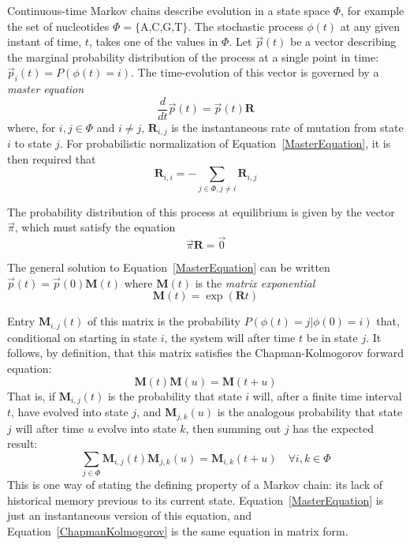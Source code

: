 \documentclass{bmcart}
\newcommand{\matr}[1]{\mathbf{#1}}
\newcommand{\eqref}[1]{Equation~\ref{#1}}
\newcommand{\statespace}{\Phi}
\newcommand{\state}{\phi}
\newcommand{\statevec}{\vec{p}}
\newcommand{\ratematrix}{\matr{R}}
\newcommand{\eqmvec}{\vec{\pi}}
\newcommand{\condmatrix}{\matr{M}}
\begin{document}
Continuous-time Markov chains describe evolution in a state space $\statespace$,
for example the set of nucleotides $\statespace = \{ \mbox{A,C,G,T} \}$.
The stochastic process $\state(t)$ at any given instant of time, $t$,
takes one of the values in $\statespace$.
Let $\statevec(t)$ be a vector describing the marginal probability distribution of the process
at a single point in time:
$\statevec_i(t) = P(\state(t) = i)$.
The time-evolution of this vector is governed by a {\em master equation}
\begin{equation}
\frac{d}{dt} \statevec(t) = \statevec(t) \ratematrix
\label{MasterEquation}
\end{equation}
where, for $i,j \in \statespace$ and $i \neq j$,
$\ratematrix_{i,j}$ is the instantaneous rate of mutation from state $i$ to state $j$.
For probabilistic normalization of \eqref{MasterEquation},
it is then required that
\[
\ratematrix_{i,i} = -\sum_{j \in \statespace, j \neq i} \ratematrix_{i,j}
\]

The probability distribution of this process at equilibrium is given by the vector $\eqmvec$,
which must satisfy the equation
\[
\eqmvec \ratematrix = \vec{0}
\]

The general solution to \eqref{MasterEquation} can be
written $\statevec(t) = \statevec(0) \condmatrix(t)$
where $\condmatrix(t)$ is the {\em matrix exponential}
\begin{equation}
\condmatrix(t) = \exp ( \ratematrix t )
\label{MatrixExponential}
\end{equation}

Entry $\condmatrix_{i,j}(t)$ of this matrix is the probability
$P(\state(t)=j|\state(0)=i)$
that, conditional on starting in state $i$,
the system will after time $t$ be in state $j$.
It follows, by definition, that this matrix satisfies the
Chapman-Kolmogorov forward equation:
\begin{equation}
\condmatrix(t) \condmatrix(u) = \condmatrix(t+u)
\label{ChapmanKolmogorov}
\end{equation}
That is, if $\condmatrix_{i,j}(t)$ is the probability
that state $i$ will, after a finite time interval $t$, have evolved into state $j$,
and $\condmatrix_{j,k}(u)$ is the analogous probability that state $j$ will after time $u$ evolve into state $k$,
then summing out $j$ has the expected result:
\[
\sum_{j \in \statespace} \condmatrix_{i,j}(t) \condmatrix_{j,k}(u) = \condmatrix_{i,k}(t+u)
\quad \forall i,k \in \statespace
\]
This is one way of stating the defining property of a Markov chain:
its lack of historical memory previous to its current state.
\eqref{MasterEquation} is just an instantaneous version of this equation,
and \eqref{ChapmanKolmogorov} is the same equation in matrix form.
\end{document}
